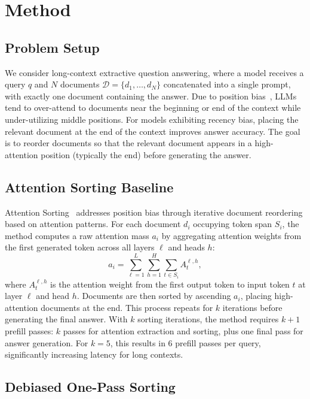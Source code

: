 \section{Method}
\label{sec:method}

\subsection{Problem Setup}

We consider long-context extractive question answering, where a model receives a query $q$ and $N$ documents $\mathcal{D} = \{d_1, \ldots, d_N\}$ concatenated into a single prompt, with exactly one document containing the answer. Due to position bias~\citep{Liu2023LostIT}, LLMs tend to over-attend to documents near the beginning or end of the context while under-utilizing middle positions. For models exhibiting recency bias, placing the relevant document at the end of the context improves answer accuracy. The goal is to reorder documents so that the relevant document appears in a high-attention position (typically the end) before generating the answer.

\subsection{Attention Sorting Baseline}

Attention Sorting~\citep{Peysakhovich2023AttentionSC} addresses position bias through iterative document reordering based on attention patterns. For each document $d_i$ occupying token span $S_i$, the method computes a raw attention mass $a_i$ by aggregating attention weights from the first generated token across all layers $\ell$ and heads $h$:
\begin{equation}
a_i = \sum_{\ell=1}^{L} \sum_{h=1}^{H} \sum_{t \in S_i} A^{\ell,h}_{t},
\end{equation}
where $A^{\ell,h}_{t}$ is the attention weight from the first output token to input token $t$ at layer $\ell$ and head $h$. Documents are then sorted by ascending $a_i$, placing high-attention documents at the end. This process repeats for $k$ iterations before generating the final answer. With $k$ sorting iterations, the method requires $k+1$ prefill passes: $k$ passes for attention extraction and sorting, plus one final pass for answer generation. For $k=5$, this results in 6 prefill passes per query, significantly increasing latency for long contexts.

\subsection{Debiased One-Pass Sorting}

